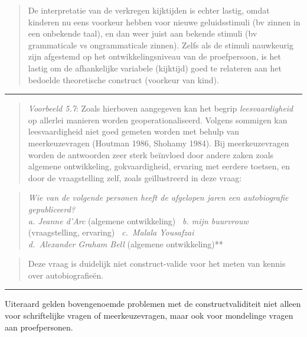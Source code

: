 \documentclass[
]{book}
\begin{document}
\begin{quote}
De interpretatie van de verkregen kijktijden is echter lastig, omdat
kinderen nu eens voorkeur hebben voor nieuwe geluidsstimuli (bv zinnen
in een onbekende taal), en dan weer juist aan bekende stimuli (bv
grammaticale vs ongrammaticale zinnen). Zelfs als de stimuli nauwkeurig
zijn afgestemd op het ontwikkelingsniveau van de proefpersoon, is het
lastig om de afhankelijke variabele (kijktijd) goed te relateren aan het
bedoelde theoretische construct (voorkeur van kind).
\end{quote}

\begin{center}\rule{0.5\linewidth}{0.5pt}\end{center}

\begin{quote}
\emph{Voorbeeld 5.7}: Zoals hierboven aangegeven kan het begrip \emph{leesvaardigheid} op allerlei
manieren worden geoperationaliseerd. Volgens sommigen kan
leesvaardigheid niet goed gemeten worden met behulp van meerkeuzevragen
(Houtman 1986, Shohamy 1984). Bij meerkeuzevragen worden de antwoorden
zeer sterk beïnvloed door andere zaken zoals algemene ontwikkeling,
gokvaardigheid, ervaring met eerdere toetsen, en door de vraagstelling
zelf, zoals geïllustreerd in deze vraag:
\end{quote}

\begin{quote}
\emph{Wie van de volgende personen heeft de afgelopen jaren een autobiografie
gepubliceerd?\\
\hspace*{0.333em}a. Jeanne d'Arc }(algemene ontwikkeling)\emph{\hfill\break
~b. mijn buurvrouw }(vraagstelling, ervaring)\emph{\hfill\break
~c.~Malala Yousafzai\\
\hspace*{0.333em}d.~Alexander Graham Bell }(algemene ontwikkeling)**\\
\end{quote}

\begin{quote}
Deze vraag is duidelijk niet construct-valide voor het meten van kennis
over autobiografieën.
\end{quote}

\begin{center}\rule{0.5\linewidth}{0.5pt}\end{center}

Uiteraard gelden bovengenoemde problemen met de constructvaliditeit niet
alleen voor schriftelijke vragen of meerkeuzevragen, maar ook voor
mondelinge vragen aan proefpersonen.
\end{document}
